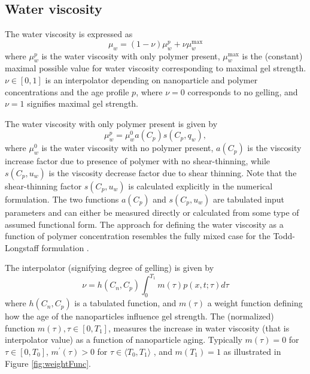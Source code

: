 \subsection{Water viscosity}
The water viscosity is expressed as
\begin{equation}
    \mu_w=(1-\nu)\mu^p_w + \nu\mu_w^{\max}
\end{equation}
where $\mu^p_w$ is the water viscosity with only polymer present, $\mu_w^{\max}$ is the (constant) maximal possible value for water viscosity corresponding to maximal gel strength. $\nu\in[0,1]$ is an interpolator depending on nanoparticle and polymer concentrations and the age profile $p$, where  $\nu=0$ corresponds to no gelling, and $\nu=1$  signifies maximal gel strength.

The water viscosity with only polymer present is given by
\begin{equation}
    \mu_w^p=\mu_w^0 a(C_p) s(C_p, q_w),
\end{equation}
where $\mu_w^0$ is the water viscosity with no polymer present, $a (C_p)$ is the viscosity increase factor due to presence of polymer with no shear-thinning, while $s(C_p, u_w)$ is the viscosity decrease factor due to shear thinning. Note that the shear-thinning factor $s(C_p, u_w)$ is calculated explicitly in the numerical formulation. The two functions $a (C_p)$ and $s(C_p, u_w)$ are tabulated input parameters and can either be measured directly or calculated from some type of assumed functional form. The approach for defining the water viscosity as a function of polymer concentration resembles the fully mixed case for the Todd-Longstaff formulation \citep{slb2015}.   

The interpolator (signifying degree of gelling) is given by
\begin{equation} \label{eq:ageEffect} %
    \nu=h(C_n,C_p) \int^{T_1}_{0}m(\tau)p(x,t;\tau)d\tau
\end{equation}
where $h(C_n,C_p)$ is a tabulated function, and $m(\tau)$ a weight function defining how the age of the nanoparticles influence gel strength. The (normalized) function $m(\tau), \tau\in[0,T_1]$, measures the increase in water viscosity (that is interpolator value) as a function of nanoparticle aging. Typically $m(\tau)=0$ for $\tau\in[0,T_0]$,  $m^\prime(\tau)>0$ for $\tau\in\langle T_0, T_1\rangle$ , and $m(T_1)=1$ as illustrated in Figure \ref{fig:weightFunc}.

